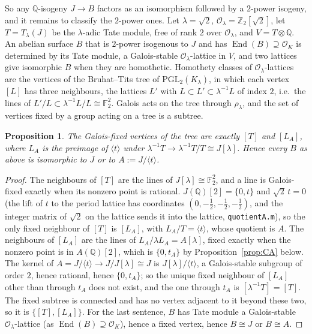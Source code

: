 \documentclass[11pt,reqno]{amsart}
\theoremstyle{plain}
\newtheorem{proposition}[theorem]{Proposition}
\theoremstyle{definition}
\DeclareMathOperator{\End}{End}
\newcommand{\Q}{\mathbb{Q}}
\newcommand{\Z}{\mathbb{Z}}
\newcommand{\F}{\mathbb{F}}
\newcommand{\OK}{\mathcal{O}_K}
\begin{document}
So any $\Q$-isogeny $J\to B$ factors as an isomorphism followed by a $2$-power isogeny, and it
remains to classify the $2$-power ones. Let $\lambda=\sqrt2$, $\mathcal O_\lambda=\Z_2[\sqrt2]$, let
$T=T_\lambda(J)$ be the $\lambda$-adic Tate module, free of rank $2$ over $\mathcal O_\lambda$, and
$V=T\otimes\Q$. An abelian surface $B$ that is $2$-power isogenous to $J$ and has
$\End(B)\supseteq\OK$ is determined by its Tate module, a Galois-stable $\mathcal O_\lambda$-lattice
in $V$, and two lattices give isomorphic $B$ when they are homothetic. Homothety classes of
$\mathcal O_\lambda$-lattices are the vertices of the Bruhat--Tits tree of $\mathrm{PGL}_2(K_\lambda)$,
in which each vertex $[L]$ has three neighbours, the lattices $L'$ with $L\subset L'\subset
\lambda^{-1}L$ of index $2$, i.e.\ the lines of $L'/L\subset\lambda^{-1}L/L\cong\F_2^2$. Galois acts
on the tree through $\rho_\lambda$, and the set of vertices fixed by a group acting on a tree is a
subtree.

\begin{proposition}\label{prop:tree}
The Galois-fixed vertices of the tree are exactly $[T]$ and $[L_A]$, where $L_A$ is the preimage of
$\langle t\rangle$ under $\lambda^{-1}T\to\lambda^{-1}T/T\cong J[\lambda]$. Hence every $B$ as above
is isomorphic to $J$ or to $A:=J/\langle t\rangle$.
\end{proposition}
\begin{proof}
The neighbours of $[T]$ are the lines of $J[\lambda]\cong\F_2^2$, and a line is Galois-fixed exactly
when its nonzero point is rational. $J(\Q)[2]=\{0,t\}$ and $\sqrt2\,t=0$ (the lift of $t$ to the
period lattice has coordinates $(0,-\tfrac12,-\tfrac12,-\tfrac12)$, and the integer matrix of
$\sqrt2$ on the lattice sends it into the lattice, \texttt{quotientA.m}), so the only fixed
neighbour of $[T]$ is $[L_A]$, with $L_A/T=\langle t\rangle$, whose quotient is $A$. The neighbours
of $[L_A]$ are the lines of $L_A/\lambda L_A=A[\lambda]$, fixed exactly when the nonzero point is in
$A(\Q)[2]$, which is $\{0,t_A\}$ by Proposition~\ref{prop:CA} below. The kernel of
$A=J/\langle t\rangle\to J/J[\lambda]\cong J$ is $J[\lambda]/\langle t\rangle$, a Galois-stable
subgroup of order $2$, hence rational, hence $\{0,t_A\}$; so the unique fixed neighbour of $[L_A]$
other than through $t_A$ does not exist, and the one through $t_A$ is $[\lambda^{-1}T]=[T]$. The
fixed subtree is connected and has no vertex adjacent to it beyond these two, so it is
$\{[T],[L_A]\}$. For the last sentence, $B$ has Tate module a Galois-stable $\mathcal O_\lambda$-lattice
(as $\End(B)\supseteq\OK$), hence a fixed vertex, hence $B\cong J$ or $B\cong A$.
\end{proof}
\end{document}

